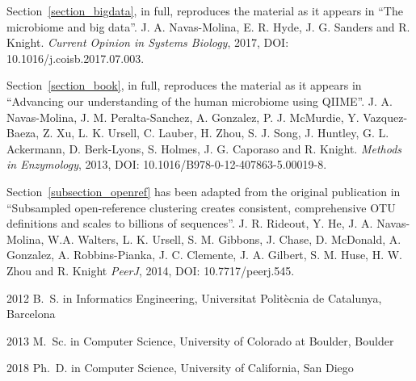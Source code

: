 \begin{frontmatter}
\printglossary[title=List of Abbreviations,toctitle=List of Abbreviations,nonumberlist ]
\listoffigures  %
\listoftables   %

%
%
\begin{acknowledgements}

    Section~\ref{section_bigdata}, in full, reproduces the material as it
    appears in ``The microbiome and big data''. J. A. Navas-Molina, E. R. Hyde,
	J. G. Sanders and R. Knight. \emph{Current Opinion in Systems Biology},
	2017, DOI: 10.1016/j.coisb.2017.07.003.

	Section~\ref{section_book}, in full, reproduces the material as it
    appears in ``Advancing our understanding of the human microbiome using QIIME''.
	J. A. Navas-Molina, J. M. Peralta-Sanchez, A. Gonzalez, P. J. McMurdie,
	Y. Vazquez-Baeza, Z. Xu, L. K. Ursell, C. Lauber, H. Zhou, S. J. Song,
	J. Huntley, G. L. Ackermann, D. Berk-Lyons, S. Holmes, J. G. Caporaso and R.
	Knight. \emph{Methods in Enzymology}, 2013, DOI: 10.1016/B978-0-12-407863-5.00019-8.

	Section~\ref{subsection_openref} has been adapted from the original publication in
	``Subsampled open-reference clustering creates consistent, comprehensive OTU
	definitions and scales to billions of sequences''. J. R. Rideout, Y. He,
	J. A. Navas-Molina, W.A. Walters, L. K. Ursell, S. M. Gibbons, J. Chase,
	D. McDonald, A. Gonzalez, A. Robbins-Pianka, J. C. Clemente, J. A. Gilbert,
	S. M. Huse, H. W. Zhou and R. Knight \emph{PeerJ}, 2014, DOI: 10.7717/peerj.545.

\end{acknowledgements}


%
%
\begin{vitapage}
\begin{vita}
  \item[2012] B.~S. in Informatics Engineering, Universitat Polit\`ecnia de Catalunya, Barcelona
  \item[2013] M.~Sc. in Computer Science, University of Colorado at Boulder, Boulder
  \item[2018] Ph.~D. in Computer Science, University of California, San Diego
\end{vita}



\end{vitapage}
\end{frontmatter}
